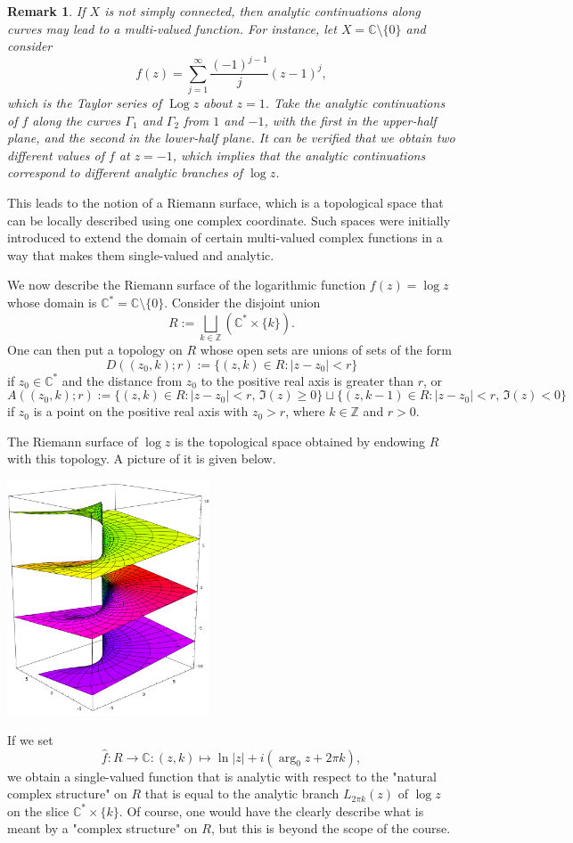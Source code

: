 \documentclass[10pt]{article}
\newcommand{\C}{\mathbb{C}}
\newcommand{\Z}{\mathbb{Z}}
\DeclareMathOperator{\Log}{Log}
\theoremstyle{newstyle}
\newtheorem{remark}[thm]{Remark}
\begin{document}
\begin{remark}
If $X$ is not simply connected, then analytic continuations along curves may lead to a 
multi-valued function. For instance, let $X = \C \setminus \{0\}$ and consider 
\[ f(z) = \sum_{j=1}^\infty \frac{(-1)^{j-1}}{j} (z-1)^j, \]
which is the Taylor series of $\Log z$ about $z = 1$. Take the analytic continuations of $f$ 
along the curves $\Gamma_1$ and $\Gamma_2$ from $1$ and $-1$, with the first in the 
upper-half plane, and the second in the lower-half plane. It can be verified that 
we obtain two different values of $f$ at $z = -1$, which implies that the analytic 
continuations correspond to different analytic branches of $\log z$. 
\end{remark}

This leads to the notion of a Riemann surface, which is a topological space that can be locally 
described using one complex coordinate. Such spaces were initially introduced to extend the 
domain of certain multi-valued complex functions in a way that makes them single-valued 
and analytic. 

We now describe the Riemann surface of the logarithmic function $f(z) = \log z$
whose domain is $\C^* = \C \setminus \{0\}$. Consider the disjoint union 
\[ R := \bigsqcup_{k\in\Z} (\C^* \times \{k\}). \]
One can then put a topology on $R$ whose open sets are unions of sets of the form 
\[ D((z_0, k); r) := \{(z, k) \in R : |z-z_0| < r\} \]
if $z_0 \in \C^*$ and the distance from $z_0$ to the positive real axis is greater than $r$, or 
\[ A((z_0, k); r) := \{(z, k) \in R : |z-z_0|<r,\, \Im(z) \geq 0\} 
\sqcup \{(z, k-1) \in R : |z-z_0|<r,\, \Im(z) < 0\} \]
if $z_0$ is a point on the positive real axis with $z_0 > r$, where $k \in \Z$ and $r > 0$. 

The Riemann surface of $\log z$ is the topological space obtained by endowing $R$ with this topology. 
A picture of it is given below.
\begin{center}
\includegraphics[width=0.45\textwidth]{Riemann.png}
\end{center}
If we set 
\[ \hat f : R \to \C : (z, k) \mapsto \ln|z| + i(\arg_0 z + 2\pi k), \]
we obtain a single-valued function that is analytic with respect to the "natural complex structure" 
on $R$ that is equal to the analytic branch $L_{2\pi k}(z)$ of $\log z$ on the slice 
$\C^* \times \{k\}$. Of course, one would have the clearly describe what is meant by a 
"complex structure" on $R$, but this is beyond the scope of the course. 
\end{document}
